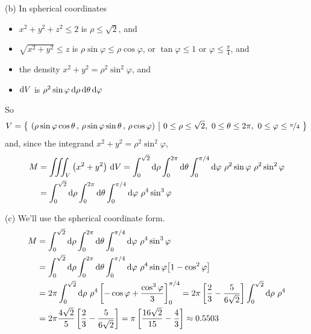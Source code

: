 \begin{solution}
(b)
In spherical coordinates
\begin{itemize}
\item
$x^2+y^2+z^2\le 2$ is $\rho\le\sqrt{2}$, and
\item
$\sqrt{x^2+y^2}\le z$ is $\rho\sin\varphi\le \rho\cos\varphi$,
or $\tan\varphi\le 1$ or $\varphi\le\frac{\pi}{4}$, and
\item
the density $x^2+y^2=\rho^2\sin^2\varphi$, and
\item
$\mathrm{d}V$ is $\rho^2\sin\varphi\,\mathrm{d}\rho\,\mathrm{d}\theta\,\mathrm{d}\varphi$
\end{itemize}
So
\begin{equation*}
V =\Set{(\rho\sin\varphi\cos\theta\,,\,\rho\sin\varphi\sin\theta\,,\,
          \rho\cos\varphi)}{0\le\rho\le \sqrt{2},\  0\le\theta\le2\pi,\ 
                            0\le \varphi\le \nicefrac{\pi}{4}}
\end{equation*}
and, since the integrand $x^2+y^2=\rho^2\sin^2\varphi$,
\begin{align*}
M &=\tripInt_V \big(x^2+y^2\big)\ \dee{V} 
   =\int_0^{\sqrt{2}}\dee{\rho}\int_0^{2\pi}\dee{\theta}
           \int_0^{\pi/4}\dee{\varphi}\ \rho^2\sin\varphi\ 
           \rho^2\sin^2\varphi \\
   &=\int_0^{\sqrt{2}}\dee{\rho}\int_0^{2\pi}\dee{\theta}
           \int_0^{\pi/4}\dee{\varphi}\ \rho^4\sin^3\varphi
\end{align*}


(c) We'll use the spherical coordinate form.
\begin{align*}
M &=\int_0^{\sqrt{2}}\mathrm{d}\rho\int_0^{2\pi}\mathrm{d}\theta
           \int_0^{\pi/4}\mathrm{d}\varphi\ \rho^4\sin^3\varphi \\
   &=\int_0^{\sqrt{2}}\mathrm{d}\rho\int_0^{2\pi}\mathrm{d}\theta
           \int_0^{\pi/4}\mathrm{d}\varphi\ \rho^4\sin\varphi
              \big[1-\cos^2\varphi\big] \\
   &=2\pi \int_0^{\sqrt{2}}\mathrm{d}\rho\ \rho^4
                \left[-\cos\varphi +\frac{\cos^3\varphi}{3}\right]_0^{\pi/4}
    =2\pi \left[\frac{2}{3} - \frac{5}{6\sqrt{2}}\right]
                      \int_0^{\sqrt{2}}\mathrm{d}\rho\ \rho^4 \\
    &=2\pi \frac{4\sqrt{2}}{5}\left[\frac{2}{3} - \frac{5}{6\sqrt{2}}\right]
     =\pi \left[\frac{16\sqrt{2}}{15} - \frac{4}{3}\right]
     \approx 0.5503
\end{align*}

\end{solution}


